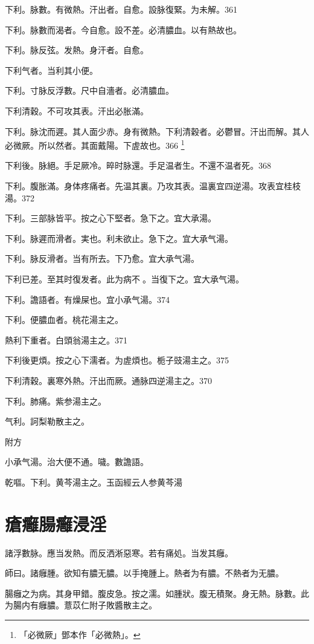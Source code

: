 下利。脉數。有微熱。汗出者。自愈。設{\khaaitp 脉}復緊。为未解。361

下利。脉數而渴者。今自愈。設不差。必清膿血。以有熱故也。

下利。脉反弦。发熱。身汗者。自愈。

下利气者。当利其小便。

下利。寸脉反浮數。尺中自濇者。必清膿血。

下利清穀。不可攻其表。汗出必胀滿。

下利。脉沈而遲。其人面少赤。身有微熱。下利清穀者。必鬱冒。汗出而解。其人必微厥。所以然者。其面戴陽。下虗故也。366
	\footnote{
		「必微厥」鄧本作「必微熱」。
	}

下利後。脉絕。手足厥{\khaaitp 冷}。晬时脉還。手足温者生。不還{\khaaitp 不温}者死。368

下利。腹胀滿。身体疼痛者。先温其裏。乃攻其表。温裏宜四逆湯。攻表宜桂枝湯。372

下利。三部脉皆平。按之心下堅者。急下之。宜大承湯。

下利。脉遲而滑者。実也。利未欲止。急下之。宜大承气湯。

下利。脉反滑{\khaaitp 者}。当有所去。下乃愈。宜大承气湯。

下利已差。至其时復发者。此为病不{\sungtpii 𥁞}。当{\khaaitp 復}下之。宜{\khaaitp 大}承气湯。

下利。譫語者。有燥屎也。宜{\khaaitp 小}承气湯。374

下利。便膿血者。桃花湯主之。

熱利下重者。白頭翁湯主之。371

下利後更煩。按之心下濡者。为虗煩也。栀子{\khaaitp 豉}湯主之。375

下利清穀。裏寒外熱。汗出而厥。通脉四逆湯主之。370

下利。肺痛。紫参湯主之。

气利。訶梨勒散主之。

附方

小承气湯。治大便不通。噦。數譫語。

乾嘔。下利。黄芩湯主之。{\scriptsize 玉函經云人参黄芩湯}

\chapter{瘡癰腸癰浸淫}

諸浮數脉。應当发熱。而反洒淅惡寒。若有痛処。当发其癰。

師曰。諸癰腫。欲知有膿无膿。以手掩腫上。熱者为有膿。不熱者为无膿。

腸癰之为病。其身甲錯。腹皮急。按之濡。如腫狀。腹无積聚。身无熱。脉數。此为腸内有{\khaaitp 癰}膿。薏苡{\khaaitp 仁}附子敗醬散主之。

